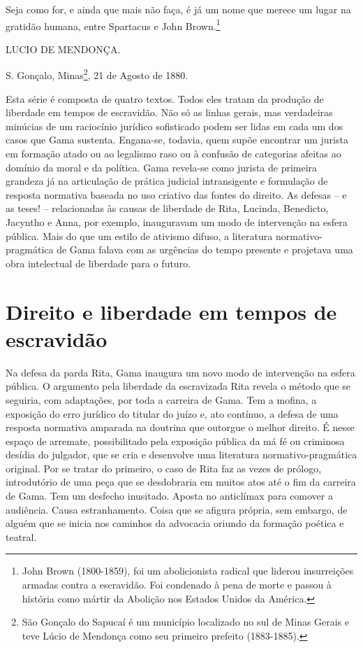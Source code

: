 Seja como for, e ainda que mais não faça, é já um nome que merece um
lugar na gratidão humana, entre Spartacus e John Brown.\footnote{John
  Brown (1800-1859), foi um abolicionista radical que liderou
  insurreições armadas contra a escravidão. Foi condenado à pena de
  morte e passou à história como mártir da Abolição nos Estados Unidos
  da América.}

LUCIO DE MENDONÇA.

S. Gonçalo, Minas\footnote{São Gonçalo do Sapucaí é um município
  localizado no sul de Minas Gerais e teve Lúcio de Mendonça como seu
  primeiro prefeito (1883-1885).},
21 de Agosto de 1880.


\pagebreak
\mbox{}\vfill
\thispagestyle{empty}

{\small\noindent
Esta série é composta de quatro textos. Todos eles tratam da
produção de liberdade em tempos de escravidão. Não só as linhas gerais,
mas verdadeiras minúcias de um raciocínio jurídico sofisticado podem ser
lidas em cada um dos casos que Gama sustenta. Engana-se, todavia, quem
supõe encontrar um jurista em formação atado ou ao legalismo raso ou à
confusão de categorias afeitas ao domínio da moral e da política. Gama
revela-se como jurista de primeira grandeza já na articulação de prática
judicial intransigente e formulação de resposta normativa baseada no uso
criativo das fontes do direito. As defesas -- e as teses! --
relacionadas às causas de liberdade de Rita, Lucinda, Benedicto,
Jacyntho e Anna, por exemplo, inauguravam um modo de intervenção na
esfera pública. Mais do que um estilo de ativismo difuso, a literatura
normativo-pragmática de Gama falava com as urgências do tempo presente e
projetava uma obra intelectual de liberdade para o futuro.}

\part{Direito e liberdade em tempos de escravidão}

\pagebreak
\mbox{}\vfill
\thispagestyle{empty}

{\small\noindent
Na defesa da parda Rita, Gama inaugura um novo modo de intervenção
na esfera pública. O argumento pela liberdade da escravizada Rita revela
o método que se seguiria, com adaptações, por toda a carreira de Gama.
Tem a mofina, a exposição do erro jurídico do titular do juízo e, ato
contínuo, a defesa de uma resposta normativa amparada na doutrina que
outorgue o melhor direito. É nesse espaço de arremate, possibilitado
pela exposição pública da má fé ou criminosa desídia do julgador, que se
cria e desenvolve uma literatura normativo-pragmática original. Por se
tratar do primeiro, o caso de Rita faz as vezes de prólogo, introdutório
de uma peça que se desdobraria em muitos atos até o fim da carreira de
Gama. Tem um desfecho inusitado. Aposta no anticlímax para comover a
audiência. Causa estranhamento. Coisa que se afigura própria, sem
embargo, de alguém que se inicia nos caminhos da advocacia oriundo da
formação poética e teatral. }

